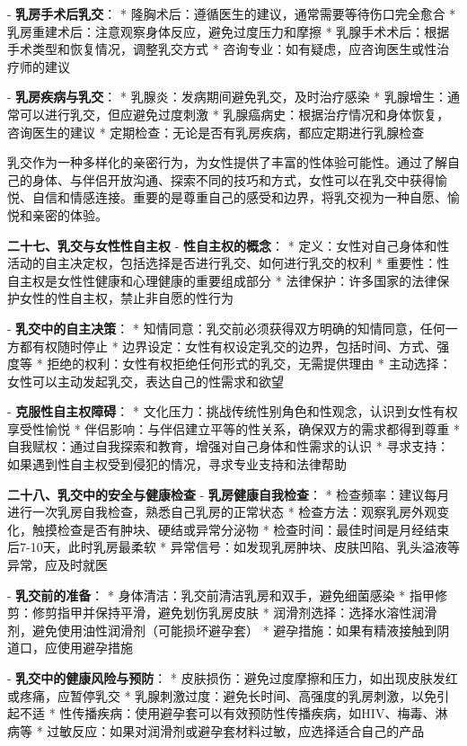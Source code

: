 \begin{enumerate}
  - \textbf{乳房手术后乳交}：
    * 隆胸术后：遵循医生的建议，通常需要等待伤口完全愈合
    * 乳房重建术后：注意观察身体反应，避免过度压力和摩擦
    * 乳腺手术术后：根据手术类型和恢复情况，调整乳交方式
    * 咨询专业：如有疑虑，应咨询医生或性治疗师的建议

  - \textbf{乳房疾病与乳交}：
    * 乳腺炎：发病期间避免乳交，及时治疗感染
    * 乳腺增生：通常可以进行乳交，但应避免过度刺激
    * 乳腺癌病史：根据治疗情况和身体恢复，咨询医生的建议
    * 定期检查：无论是否有乳房疾病，都应定期进行乳腺检查

乳交作为一种多样化的亲密行为，为女性提供了丰富的性体验可能性。通过了解自己的身体、与伴侣开放沟通、探索不同的技巧和方式，女性可以在乳交中获得愉悦、自信和情感连接。重要的是尊重自己的感受和边界，将乳交视为一种自愿、愉悦和亲密的体验。

  \textbf{二十七、乳交与女性性自主权}
  - \textbf{性自主权的概念}：
    * 定义：女性对自己身体和性活动的自主决定权，包括选择是否进行乳交、如何进行乳交的权利
    * 重要性：性自主权是女性性健康和心理健康的重要组成部分
    * 法律保护：许多国家的法律保护女性的性自主权，禁止非自愿的性行为

  - \textbf{乳交中的自主决策}：
    * 知情同意：乳交前必须获得双方明确的知情同意，任何一方都有权随时停止
    * 边界设定：女性有权设定乳交的边界，包括时间、方式、强度等
    * 拒绝的权利：女性有权拒绝任何形式的乳交，无需提供理由
    * 主动选择：女性可以主动发起乳交，表达自己的性需求和欲望

  - \textbf{克服性自主权障碍}：
    * 文化压力：挑战传统性别角色和性观念，认识到女性有权享受性愉悦
    * 伴侣影响：与伴侣建立平等的性关系，确保双方的需求都得到尊重
    * 自我赋权：通过自我探索和教育，增强对自己身体和性需求的认识
    * 寻求支持：如果遇到性自主权受到侵犯的情况，寻求专业支持和法律帮助

  \textbf{二十八、乳交中的安全与健康检查}
  - \textbf{乳房健康自我检查}：
    * 检查频率：建议每月进行一次乳房自我检查，熟悉自己乳房的正常状态
    * 检查方法：观察乳房外观变化，触摸检查是否有肿块、硬结或异常分泌物
    * 检查时间：最佳时间是月经结束后7-10天，此时乳房最柔软
    * 异常信号：如发现乳房肿块、皮肤凹陷、乳头溢液等异常，应及时就医

  - \textbf{乳交前的准备}：
    * 身体清洁：乳交前清洁乳房和双手，避免细菌感染
    * 指甲修剪：修剪指甲并保持平滑，避免划伤乳房皮肤
    * 润滑剂选择：选择水溶性润滑剂，避免使用油性润滑剂（可能损坏避孕套）
    * 避孕措施：如果有精液接触到阴道口，应使用避孕措施

  - \textbf{乳交中的健康风险与预防}：
    * 皮肤损伤：避免过度摩擦和压力，如出现皮肤发红或疼痛，应暂停乳交
    * 乳腺刺激过度：避免长时间、高强度的乳房刺激，以免引起不适
    * 性传播疾病：使用避孕套可以有效预防性传播疾病，如HIV、梅毒、淋病等
    * 过敏反应：如果对润滑剂或避孕套材料过敏，应选择适合自己的产品


\end{enumerate}

